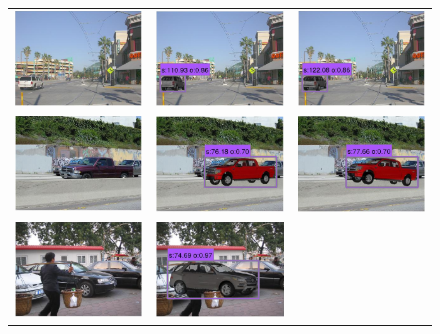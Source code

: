 \documentclass[10pt,twocolumn,letterpaper]{article}
\begin{document}
\begin{figure}[h]
\setlength\tabcolsep{1pt}
\centering
\begin{tabular}{ccc}
  \includegraphics[width=0.22\linewidth]{supp/tuning_1a.png} &
  \includegraphics[width=0.22\linewidth]{supp/tuning_1b.png} & 
  \includegraphics[width=0.22\linewidth]{supp/tuning_1c.png}  \\
  \includegraphics[width=0.22\linewidth]{supp/tuning_2a.png} &
  \includegraphics[width=0.22\linewidth]{supp/tuning_2b.png} & 
  \includegraphics[width=0.22\linewidth]{supp/tuning_2c.png}  \\ 
  \includegraphics[width=0.22\linewidth]{supp/tuning_3a.png} &
  \includegraphics[width=0.22\linewidth]{supp/tuning_3b.png} & 

\end{tabular}
\end{figure}
\end{document}
